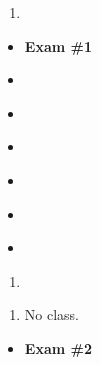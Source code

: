 \documentclass{article}
\begin{document}
\dia{}
\begin{enumerate}
\item {}
\end{enumerate}

\week{}
\dia{}
\Review{}
\dia{}
\begin{itemize}
\item[ ] \textbf{Exam \#1}
\end{itemize}



\week{}
\dia{}
\begin{itemize}
\item {}
\end{itemize}

\dia{}
\begin{itemize}
\item {}
\end{itemize}

\week{}
\dia{}
\begin{itemize}
\item {}
\end{itemize}

\dia{}
\begin{itemize}
\item {}
\end{itemize}

\week{}
\dia{}
\begin{itemize}
\item {}
\end{itemize}

\dia{}
\begin{itemize}
\item {}
\end{itemize}

\week{}
\dia{}
\begin{enumerate}
\item {}
\end{enumerate}


\dia{}
\begin{enumerate}
\item No class.
\end{enumerate}

\week{}
\dia{}
\Review{}

\dia{}
\begin{itemize}
\item[ ] \textbf{Exam \#2}
\end{itemize}
\end{document}
